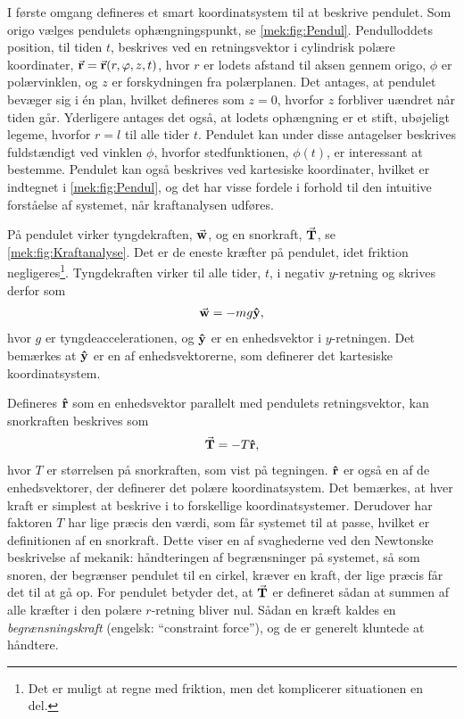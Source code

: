 \begin{example} \label{mek:ex:pendul_newton}%
I første omgang defineres et smart koordinatsystem til at beskrive pendulet. Som origo vælges pendulets ophængningspunkt, se \cref{mek:fig:Pendul}. Pendulloddets position, til tiden $t$, beskrives ved en retningsvektor i cylindrisk polære koordinater, $\va{r} = \va{r}(r,\varphi,z,t)$, hvor $r$ er lodets afstand til aksen gennem origo, $\phi$ er polærvinklen, og $z$ er forskydningen fra polærplanen. Det antages, at pendulet bevæger sig i én plan, hvilket defineres som $z=0$, hvorfor $z$ forbliver uændret når tiden går. Yderligere antages det også, at lodets ophængning er et stift, ubøjeligt legeme, hvorfor $r=l$ til alle tider $t$. Pendulet kan under disse antagelser beskrives fuldstændigt ved vinklen $\phi$, hvorfor stedfunktionen, $\phi(t)$, er interessant at bestemme. Pendulet kan også beskrives ved kartesiske koordinater, hvilket er indtegnet i \cref{mek:fig:Pendul}, og det har visse fordele i forhold til den intuitive forståelse af systemet, når kraftanalysen udføres.

På pendulet virker tyngdekraften, $\va{w}$, og en snorkraft, $\va{T}$, se \cref{mek:fig:Kraftanalyse}. Det er de eneste kræfter på pendulet, idet friktion negligeres\footnote{Det er muligt at regne med friktion, men det komplicerer situationen en del.}. Tyngdekraften virker til alle tider, $t$, i negativ $y$-retning og skrives derfor som
%
\begin{align}
	\va{w} = -mg\vu{y},
\end{align}
%
hvor $g$ er tyngdeaccelerationen, og $\vu{y}$ er en enhedsvektor i $y$-retningen. Det bemærkes at $\vu{y}$ er en af enhedsvektorerne, som definerer det kartesiske koordinatsystem.

Defineres $\vu{r}$ som en enhedsvektor parallelt med pendulets retningsvektor, kan snorkraften beskrives som
%
\begin{align}
	\va{T} = -T\vu{r},
\end{align}
%
hvor $T$ er størrelsen på snorkraften, som vist på tegningen. $\vu{r}$ er også en af de enhedsvektorer, der definerer det polære koordinatsystem. Det bemærkes, at hver kraft er simplest at beskrive i to forskellige koordinatsystemer. Derudover har faktoren $T$ har lige præcis den værdi, som får systemet til at passe, hvilket er definitionen af en snorkraft. Dette viser en af svaghederne ved den Newtonske beskrivelse af mekanik: håndteringen af begrænsninger på systemet, så som snoren, der begrænser pendulet til en cirkel, kræver en kraft, der lige præcis får det til at gå op. For pendulet betyder det, at $\va{T}$ er defineret sådan at summen af alle kræfter i den polære $r$-retning bliver nul. Sådan en kræft kaldes en \emph{begrænsningskraft} (engelsk: ``constraint force''), og de er generelt kluntede at håndtere.


\end{example}
